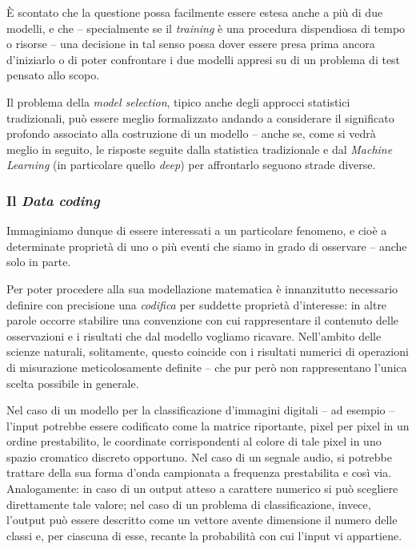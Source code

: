 \documentclass[a4paper, twoside]{article}
\begin{document}
È scontato che la questione possa facilmente essere estesa anche a più di due modelli, e che -- specialmente se il \textit{training} è una procedura dispendiosa di tempo o risorse -- una decisione in tal senso possa dover essere presa prima ancora d'iniziarlo o di poter confrontare i due modelli appresi su di un problema di test pensato allo scopo.

Il problema della \textit{model selection}, tipico anche degli approcci statistici tradizionali, può essere meglio formalizzato andando a considerare il significato profondo associato alla costruzione di un modello -- anche se, come si vedrà meglio in seguito, le risposte seguite dalla statistica tradizionale e dal \textit{Machine Learning} (in particolare quello \textit{deep}) per affrontarlo seguono strade diverse.

\subsubsection{Il \textit{Data coding}}

Immaginiamo dunque di essere interessati a un particolare fenomeno, e cioè a determinate proprietà di uno o più eventi che siamo in grado di osservare -- anche solo in parte.

Per poter procedere alla sua modellazione matematica è innanzitutto necessario definire con precisione una \textit{codifica} per suddette proprietà d'interesse: in altre parole occorre stabilire una convenzione con cui rappresentare il contenuto delle osservazioni e i risultati che dal modello vogliamo ricavare. Nell'ambito delle scienze naturali, solitamente, questo coincide con i risultati numerici di operazioni di misurazione meticolosamente definite -- che pur però non rappresentano l'unica scelta possibile in generale.

Nel caso di un modello per la classificazione d'immagini digitali -- ad esempio -- l'input potrebbe essere codificato come la matrice riportante, pixel per pixel in un ordine prestabilito, le coordinate corrispondenti al colore di tale pixel in uno spazio cromatico discreto opportuno. Nel caso di un segnale audio, si potrebbe trattare della sua forma d'onda campionata a frequenza prestabilita e così via. Analogamente: in caso di un output atteso a carattere numerico si può scegliere direttamente tale valore; nel caso di un problema di classificazione, invece, l'output può essere descritto come un vettore avente dimensione il numero delle classi e, per ciascuna di esse, recante la probabilità con cui l'input vi appartiene.
\end{document}

